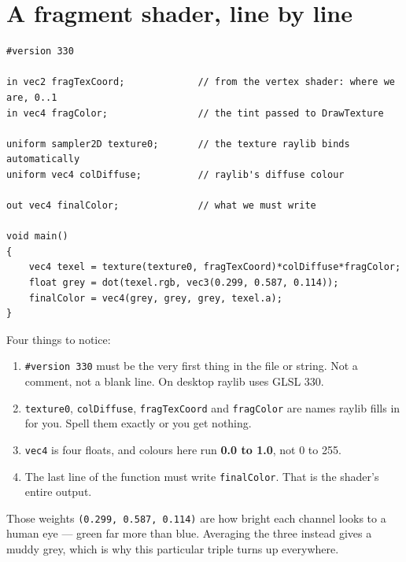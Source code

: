 
\section{A fragment shader, line by line}

\begin{lstlisting}[style=plain]
#version 330

in vec2 fragTexCoord;             // from the vertex shader: where we are, 0..1
in vec4 fragColor;                // the tint passed to DrawTexture

uniform sampler2D texture0;       // the texture raylib binds automatically
uniform vec4 colDiffuse;          // raylib's diffuse colour

out vec4 finalColor;              // what we must write

void main()
{
    vec4 texel = texture(texture0, fragTexCoord)*colDiffuse*fragColor;
    float grey = dot(texel.rgb, vec3(0.299, 0.587, 0.114));
    finalColor = vec4(grey, grey, grey, texel.a);
}
\end{lstlisting}

Four things to notice:

\begin{enumerate}[leftmargin=*,itemsep=3pt]
  \item \lstinline|#version 330| must be the very first thing in the file or
        string. Not a comment, not a blank line. On desktop raylib uses GLSL 330.
  \item \lstinline|texture0|, \lstinline|colDiffuse|, \lstinline|fragTexCoord|
        and \lstinline|fragColor| are names raylib fills in for you. Spell them
        exactly or you get nothing.
  \item \lstinline|vec4| is four floats, and colours here run \textbf{0.0 to
        1.0}, not 0 to 255.
  \item The last line of the function must write \lstinline|finalColor|. That is
        the shader's entire output.
\end{enumerate}

Those weights \lstinline|(0.299, 0.587, 0.114)| are how bright each channel looks
to a human eye --- green far more than blue. Averaging the three instead gives a
muddy grey, which is why this particular triple turns up everywhere.

